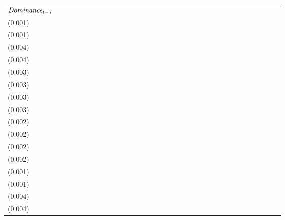 \begin{tabular}{lllllllllllllllllllllllllllllllll}
$\it Dominance_{t-1}$        &                                     &                                     &                                     &                                     &  \makecell{$0.975^{**}$ \\(0.001)} &  \makecell{$0.975^{**}$ \\(0.001)} &   \makecell{$0.713^{**}$ \\(0.004)} &   \makecell{$0.713^{**}$ \\(0.004)} &                                     &                                     &                                     &                                     &   \makecell{$0.879^{**}$ \\(0.003)} &   \makecell{$0.879^{**}$ \\(0.003)} &   \makecell{$0.825^{**}$ \\(0.003)} &   \makecell{$0.825^{**}$ \\(0.003)} &                                     &                                     &                                     &                                     &   \makecell{$0.956^{**}$ \\(0.002)} &   \makecell{$0.956^{**}$ \\(0.002)} &  \makecell{$0.926^{**}$ \\(0.002)} &  \makecell{$0.926^{**}$ \\(0.002)} &                                     &                                     &                                     &                                    &  \makecell{$0.975^{**}$ \\(0.001)} &  \makecell{$0.975^{**}$ \\(0.001)} &  \makecell{$0.717^{**}$ \\(0.004)} &  \makecell{$0.717^{**}$ \\(0.004)} \\

\end{tabular}
